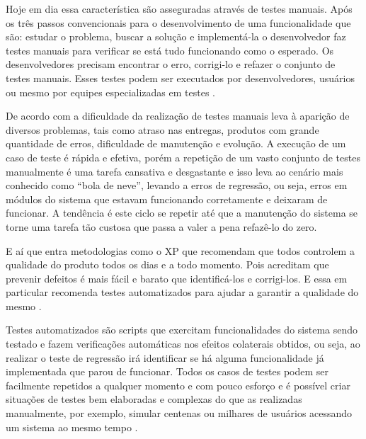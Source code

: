 Hoje em dia essa característica são asseguradas através de testes manuais. Após os três passos convencionais para o desenvolvimento de uma funcionalidade que são: estudar o problema, buscar a solução e implementá-la o desenvolvedor faz testes manuais para verificar se está tudo funcionando como o esperado. Os desenvolvedores precisam encontrar o erro, corrigi-lo e refazer o conjunto de testes manuais. Esses testes podem ser executados por desenvolvedores, usuários ou mesmo por equipes especializadas em testes \cite{kon}.

De acordo com \cite{kon} a dificuldade da realização de testes manuais leva à aparição de diversos problemas, tais como atraso nas entregas, produtos com grande quantidade de erros, dificuldade de manutenção e evolução. A execução de um caso de teste é rápida e efetiva, porém a repetição de um vasto conjunto de testes manualmente é uma tarefa cansativa e desgastante e isso leva ao cenário mais conhecido como “bola de neve”, levando a erros de regressão, ou seja, erros em módulos do sistema que estavam funcionando corretamente e deixaram de funcionar. A tendência é este ciclo se repetir até que a manutenção do sistema se torne uma tarefa tão custosa que passa a valer a pena refazê-lo do zero.

E aí que entra metodologias como o XP que recomendam que todos controlem a qualidade do produto todos os dias e a todo momento. Pois acreditam que prevenir defeitos é mais fácil e barato que identificá-los e corrigi-los. E essa em particular recomenda testes automatizados para ajudar a garantir a qualidade do mesmo \cite{kon}.

Testes automatizados são scripts que exercitam funcionalidades do sistema sendo testado e fazem verificações automáticas nos efeitos colaterais obtidos, ou seja, ao realizar o teste de regressão irá identificar se há alguma funcionalidade já implementada que parou de funcionar. Todos os casos de testes podem ser facilmente repetidos a qualquer momento e com pouco esforço e é possível criar situações de testes bem elaboradas e complexas do que as realizadas manualmente, por exemplo, simular centenas ou milhares de usuários acessando um sistema ao mesmo tempo \cite{kon}.
